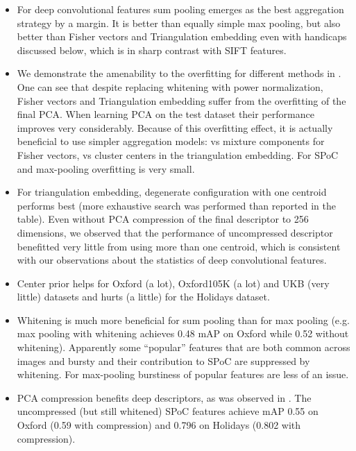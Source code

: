 \begin{itemize}
\item For deep convolutional features sum pooling emerges as the best aggregation strategy by a margin. It is better than equally simple max pooling, but also better than Fisher vectors and Triangulation embedding even with handicaps discussed below, which is in sharp contrast with SIFT features.

\item We demonstrate the amenability to the overfitting for different methods in . One can see that despite replacing whitening with power normalization, Fisher vectors and Triangulation embedding suffer from the overfitting of the final PCA. When learning PCA on the test dataset their performance improves very considerably. Because of this overfitting effect, it is actually beneficial to use simpler aggregation models:  vs  mixture components for Fisher vectors,  vs  cluster centers in the triangulation embedding. For SPoC and max-pooling overfitting is very small.

\item For triangulation embedding, degenerate configuration with one centroid performs best (more exhaustive search was performed than reported in the table). Even without PCA compression of the final descriptor to 256 dimensions, we observed that the performance of uncompressed descriptor benefitted very little from using more than one centroid, which is consistent with our observations about the statistics of deep convolutional features.



\item Center prior helps for Oxford (a lot), Oxford105K (a lot) and UKB (very little) datasets and hurts (a little) for the Holidays dataset.

\item Whitening is much more beneficial for sum pooling than for max pooling (e.g. max pooling with whitening achieves 0.48 mAP on Oxford while 0.52 without whitening). Apparently some “popular” features that are both common across images and bursty and their contribution to SPoC are suppressed by whitening. For max-pooling burstiness of popular features are less of an issue.

\item PCA compression benefits deep descriptors, as was observed in \cite{Babenko14}. The uncompressed (but still whitened) SPoC features achieve mAP 0.55 on Oxford (0.59 with compression) and 0.796 on Holidays (0.802 with compression).

\end{itemize}

